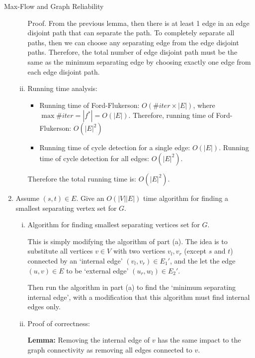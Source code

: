 \documentclass{article}
\numberwithin{table}{section}
\numberwithin{figure}{section}
\begin{document}
\begin{section}{Max-Flow and Graph Reliability}
\begin{enumerate}
\begin{tcolorbox}
\begin{enumerate}[(i)]
            Proof. From the previous lemma, then there is at least 1 edge in an edge disjoint path that can separate the path. To completely separate all paths, then we can choose any separating edge from the edge disjoint paths. Therefore, the total number of edge disjoint path must be the same as the minimum separating edge by choosing exactly one edge from each edge disjoint path.

            \item Running time analysis:
            
            \begin{itemize}
                \item Running time of Ford-Flukerson: $O(\#iter \times |E|)$, where $\max \#iter = |f^*| = O(|E|)$. Therefore, running time of Ford-Flukerson: $O(|E|^2)$
                \item Running time of cycle detection for a single edge: $O(|E|)$. Running time of cycle detection for all edges: $O(|E|^2)$.
            \end{itemize}
            
            Therefore the total running time is: $O(|E|^2)$.
        \end{enumerate}
    \end{tcolorbox}

    \newpage
    \item Assume $(s, t) \in E$. Give an $O(|V||E|)$ time algorithm for finding a smallest separating vertex set for $G$.
    
    \begin{tcolorbox}
        \begin{enumerate}[(i)]
            \item Algorithm for finding smallest separating vertices set for $G$.
            
            This is simply modifying the algorithm of part (a). The idea is to substitute all vertices $v \in V$ with two vertices $v_l, v_r$ (except $s$ and $t$) connected by an `internal edge' $(v_l, v_r) \in E_1'$, and the let the edge $(u, v) \in E$ to be `external edge' $(u_r, w_l) \in E_2'$. 

            Then run the algorithm in part (a) to find the `minimum separating internal edge', with a modification that this algorithm must find internal edges only.

            \item Proof of correctness:
            
            \textbf{Lemma:} Removing the internal edge of $v$ has the same impact to the graph connectivity as removing all edges connected to $v$. 


\end{enumerate}
\end{tcolorbox}
\end{enumerate}
\end{section}
\end{document}
